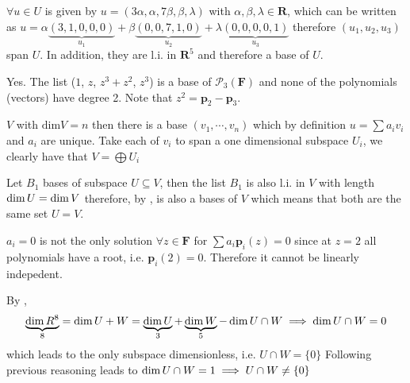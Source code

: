 \exo{}

\exo{}

\exo{}

\exo{} $\forall u\in U$ is given by $u = (3\alpha , \alpha, 7\beta, \beta, \lambda)$ with $\alpha,\beta,\lambda \in \mathbf{R}$, which can be written 
as $ u = \alpha \underbrace{(3 , 1, 0, 0, 0)}_{u_1} + \beta\underbrace{(0 , 0, 7, 1, 0)}_{u_2} + \lambda \underbrace{(0 , 0, 0, 0, 1)}_{u_3} $ therefore 
 $(u_1,u_2,u_3)$ span $U$. In addition, they are l.i. in $\mathbf{R}^5$ and therefore a base of $U$.

\exo{} Yes. The list ($1$, $z$, $z^3+z^2$, $z^3$) is a base of $\mathcal{P}_3(\mathbf{F})$ and none of the polynomials (vectors) have degree 2. Note that $z^2 = \mathbf{p}_2 - \mathbf{p}_3$.

\exo{} $V$ with $\mathrm{dim}V = n$ then there is a base $(v_1, \cdots, v_n)$ which by definition $u = \sum a_i v_i$ and $a_i$ are unique. 
Take each of $v_i$ to span a one dimensional subspace $U_i$, we clearly have that $ V = \bigoplus U_i $


\exo{}  Let $B_1$ bases of subspace $U\subseteq V $, then the list $B_1$ is also l.i. in $V$ with length $\operatorname{dim}{U} = \operatorname{dim}{V}$ 
therefore, by , is also a bases of $V$ which means that both are the same set $U=V$. 


\exo{} $a_i=0$ is not the only solution $\forall z\in \mathbf{F}$ for $\sum a_i \mathbf{p}_i(z) = 0$ since at $z=2$
all polynomials have a root, i.e. $\mathbf{p}_i(2)=0$.  Therefore it cannot be linearly indepedent. 

\exo{} By , 
\begin{align*}
  \underbrace{\operatorname{dim}{R^8}}_8 = \operatorname{dim}{U+W} = \underbrace{\operatorname{dim}{U}}_3 + \underbrace{\operatorname{dim}{W}}_5 - \operatorname{dim}{U \cap W} \implies \operatorname{dim}{U \cap W} = 0
\end{align*}
which leads to the only subspace dimensionless, i.e. $U \cap W = \{0\}$
\exo{} Following previous reasoning leads to $ \operatorname{dim}{U \cap W} = 1 \implies U\cap W \neq \{0\}$

